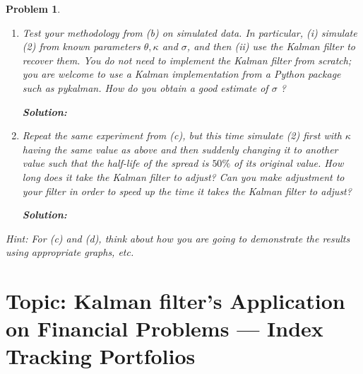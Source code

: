 \documentclass[11pt]{article}
\theoremstyle{plain} %
\newtheorem{problem}[theorem]{Problem}
\newenvironment{solution}
{\color{C2}\normalfont\begin{framed}\begingroup\textbf{Solution:} }
  {\endgroup\end{framed}}
\theoremstyle{remark}
\begin{document}
\begin{problem}
\begin{enumerate}[label=(\alph*)]
        \begin{solution}
          
        \end{solution}
  \item Test your methodology from (b) on simulated data. In particular, (i)
        simulate (2) from known parameters $\theta, \kappa$ and $\sigma$, and then
        (ii) use the Kalman filter to recover them. You do not need to implement the
        Kalman filter from scratch; you are welcome to use a Kalman implementation
        from a Python package such as pykalman. How do you obtain a good estimate of
        $\sigma$ ?

        \begin{solution}
          
        \end{solution}
  \item Repeat the same experiment from (c), but this time simulate (2) first
        with $\kappa$ having the same value as above and then suddenly changing it to
        another value such that the half-life of the spread is $50 \%$ of its original
        value. How long does it take the Kalman filter to adjust? Can you make
        adjustment to your filter in order to speed up the time it takes the Kalman
        filter to adjust?

        \begin{solution}
          
        \end{solution}
\end{enumerate}
Hint: For (c) and (d), think about how you are going to demonstrate the results
using appropriate graphs, etc.
\end{problem}

\section{Topic: Kalman filter's Application on Financial Problems --- Index Tracking Portfolios}
\end{document}
